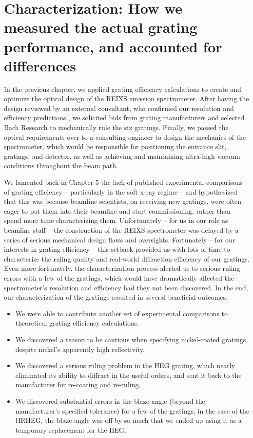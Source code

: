 \chapter{Characterization: How we measured the actual grating performance, and accounted for differences}
In the previous chapter, we applied grating efficiency calculations to create and optimize the optical design of the REIXS emission spectrometer.  After having the design reviewed by an external consultant, who confirmed our resolution and efficiency predictions \cite[Chapter 5]{Mui06}, we solicited bids from grating manufacturers and selected Bach Research to mechanically rule the six gratings.  Finally, we passed the optical requirements over to a consulting engineer to design the mechanics of the spectrometer, which would be responsible for positioning the entrance slit, gratings, and detector, as well as achieving and maintaining ultra-high vacuum conditions throughout the beam path.

We lamented back in Chapter 5 the lack of published experimental comparisons of grating efficiency -- particularly in the soft x-ray regime -- and hypothesized that this was because beamline scientists, on receiving new gratings, were often eager to put them into their beamline and start commissioning, rather than spend more time characterizing them.  Unfortunately -- for us in our role as beamline staff -- the construction of the REIXS spectrometer was delayed by a series of serious mechanical design flaws and oversights.  Fortunately -- for our interests in grating efficiency -- this setback provided us with lots of time to characterize the ruling quality and real-world diffraction efficiency of our gratings.  Even more fortunately, the characterization process alerted us to serious ruling errors with a few of the gratings, which would have dramatically affected the spectrometer's resolution and efficiency had they not been discovered.  In the end, our characterization of the gratings resulted in several beneficial outcomes:
\begin{itemize}
\item We were able to contribute another set of experimental comparisons to theoretical grating efficiency calculations.
\item We discovered a reason to be cautious when specifying nickel-coated gratings, despite nickel's apparently high reflectivity.
\item We discovered a serious ruling problem in the HEG grating, which nearly eliminated its ability to diffract in the useful orders, and sent it back to the manufacturer for re-coating and re-ruling.
\item We discovered substantial errors in the blaze angle (beyond the manufacturer's specified tolerance) for a few of the gratings; in the case of the HRHEG, the blaze angle was off by so much that we ended up using it as a temporary replacement for the HEG.
\end{itemize}


